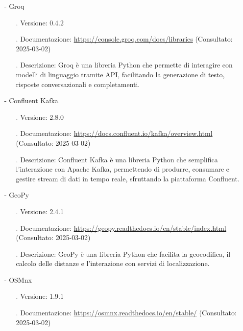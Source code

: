 \documentclass[10pt]{article}
\begin{document}
\begin{justify}
\begin{itemize}
\begin{itemize}
                    \end{itemize}
                \item[-] Groq
                    \begin{itemize}
                        \item[.] Versione: 0.4.2
                        \item[.] Documentazione: \textcolor{blue}{\url{https://console.groq.com/docs/libraries}} (Consultato: 2025-03-02)
                        \item[.] Descrizione: Groq è una libreria Python che permette di interagire con modelli di linguaggio tramite API, facilitando la 
                        generazione di testo, risposte conversazionali e completamenti.
                    \end{itemize}
                \item[-] Confluent Kafka
                    \begin{itemize}
                        \item[.] Versione: 2.8.0
                        \item[.] Documentazione: \textcolor{blue}{\url{https://docs.confluent.io/kafka/overview.html}} (Consultato: 2025-03-02)
                        \item[.] Descrizione: Confluent Kafka è una libreria Python che semplifica l’interazione con Apache Kafka, permettendo di produrre, 
                        consumare e gestire stream di dati in tempo reale, sfruttando la piattaforma Confluent.
                    \end{itemize}
                \item[-] GeoPy
                \begin{itemize}
                    \item[.] Versione: 2.4.1
                    \item[.] Documentazione: \textcolor{blue}{\url{https://geopy.readthedocs.io/en/stable/index.html}} (Consultato: 2025-03-02)
                    \item[.] Descrizione: GeoPy è una libreria Python che facilita la geocodifica, il calcolo delle distanze e l'interazione con servizi di localizzazione.
                \end{itemize}
                \item[-] OSMnx
                    \begin{itemize}
                        \item[.] Versione: 1.9.1
                        \item[.] Documentazione: \textcolor{blue}{\url{https://osmnx.readthedocs.io/en/stable/}} (Consultato: 2025-03-02)

\end{itemize}
\end{itemize}
\end{justify}
\end{document}
